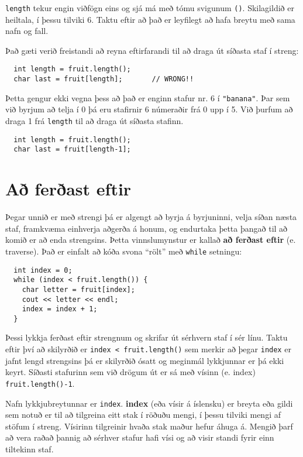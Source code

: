 {\tt length} tekur engin viðfögn eins og sjá má með tómu svigunum {\tt ()}.
Skilagildið er heiltala, í þessu tilviki 6.
Taktu eftir að það er leyfilegt að hafa breytu með sama nafn og fall. 

Það gæti verið freistandi að reyna eftirfarandi til að draga út síðasta staf í streng:

\begin{verbatim}
  int length = fruit.length();
  char last = fruit[length];       // WRONG!!
\end{verbatim}
%
Þetta gengur ekki vegna þess að það er enginn stafur nr. 6 í \verb+"banana"+.
Þar sem við byrjum að telja í 0 þá eru stafirnir 6 númeraðir frá 0 upp í 5.
Við þurfum að draga 1 frá {\tt length} til að draga út síðasta stafinn.

\begin{verbatim}
  int length = fruit.length();
  char last = fruit[length-1];
\end{verbatim}

\section{Að ferðast eftir}

Þegar unnið er með strengi þá er algengt að byrja á byrjuninni, velja síðan næsta staf, 
framkvæma einhverja aðgerða á honum, og endurtaka þetta þangað til að komið er að enda strengsins.
Þetta vinnslumynstur er kallað {\bf að ferðast eftir} (e. traverse).
Það er einfalt að kóða svona ``rölt'' með {\tt while} setningu:

\begin{verbatim}
  int index = 0;
  while (index < fruit.length()) {
    char letter = fruit[index];
    cout << letter << endl;
    index = index + 1;
  }
\end{verbatim}
%
Þessi lykkja ferðast eftir strengnum og skrifar út sérhvern staf í sér línu.
Taktu eftir því að skilyrðið er {\tt index < fruit.length()} sem merkir að þegar {\tt index} er jafnt lengd strengsins þá
er skilyrðið ósatt og meginmál lykkjunnar er þá ekki keyrt.
Síðasti stafurinn sem við drögum út er sá með vísinn (e. index) {\tt fruit.length()-1}.


Nafn lykkjubreytunnar er {\tt index}.
{\bf index} (eða vísir á íslensku) er breyta eða gildi sem notuð er til að tilgreina eitt stak í röðuðu mengi, í þessu tilviki mengi af stöfum í streng.
Vísirinn tilgreinir hvaða stak maður hefur áhuga á.
Mengið þarf að vera raðað þannig að sérhver stafur hafi vísi og að visir standi fyrir einn tiltekinn staf.


